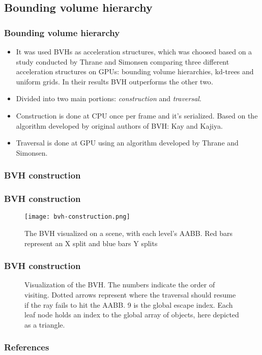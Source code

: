 \documentclass{beamer}
\newenvironment{figure*}%
{\begin{figure}}
{\end{figure}}
\begin{document}


\subsection{Bounding volume hierarchy}
\begin{frame}
  \frametitle{Bounding volume hierarchy}
\begin{itemize}
\item It was used BVHs as acceleration structures, which was choosed
  based on a study conducted by Thrane and Simonsen comparing three
  different acceleration structures on GPUs: bounding volume
  hierarchies, kd-trees and uniform grids. In their results BVH
  outperforms the other two\cite{Thrane}. %
\item Divided into two main portions: \emph{construction} and \emph{traversal}.
\item Construction is done at CPU once per frame and it's
  serialized. Based on the algorithm developed by original authors of
  BVH: Kay and Kajiya\cite{kay1986ray}.
\item Traversal is done at GPU using an algorithm developed by Thrane
  and Simonsen.
\end{itemize}

\end{frame}


\subsubsection{BVH construction}
\begin{frame}
  \frametitle{BVH construction}
\begin{figure*}
\centering
\texttt{[image: bvh-construction.png]}
\caption{The BVH visualized on a scene, with each level's AABB. Red
  bars represent an X split and blue bars Y splits}
\label{fig:bvh-construction}
\end{figure*}

\end{frame}


\begin{frame}
  \frametitle{BVH construction}
\begin{figure}
\centering


\caption{Visualization of the BVH. The numbers indicate the order of
  visiting. Dotted arrows represent where the traversal should resume
  if the ray fails to hit the AABB. 9 is the global escape index. Each
  leaf node holds an index to the global array of objects, here
  depicted as a triangle.}
\label{fig:bvh}
\end{figure}

\end{frame}


\begin{frame}[allowframebreaks]
\frametitle{References}

\end{frame}
\end{document}
